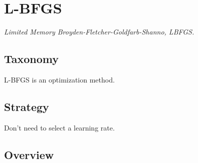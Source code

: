 
\section{L-BFGS} 
\label{sec:lbfgs}

\emph{Limited Memory Broyden-Fletcher-Goldfarb-Shanno, LBFGS.}

\subsection{Taxonomy}
L-BFGS is an optimization method.

\subsection{Strategy}

Don't need to select a learning rate.

\subsection{Overview}


